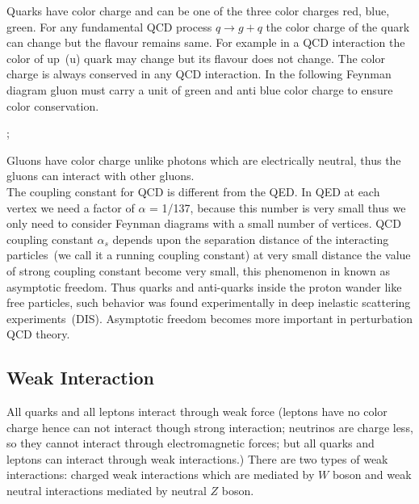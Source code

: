 Quarks have color charge and can be one of the three color charges red, blue, green. For any fundamental QCD process $q\rightarrow g+q$ the color charge of the quark can change but the flavour remains same. For example in a QCD interaction the color of up~(u) quark may change but its flavour does not change. The color charge is always conserved in any QCD interaction.
In the following Feynman diagram gluon must carry a unit of green and anti blue color charge to ensure color conservation.\\
\begin{center}
;
\end{center}
Gluons have color charge unlike photons which are electrically neutral, thus the gluons can interact with other gluons.\\
The coupling constant for QCD is different from the QED. In QED at each vertex we need a factor of $\alpha$ = 1/137, because this number is very small thus we only need to consider Feynman diagrams with a small number of vertices. QCD coupling constant $\alpha_{s}$ depends upon the separation distance of the interacting particles~(we call it a running coupling constant) at very small distance the value of strong coupling constant become very small, this phenomenon in known as asymptotic freedom. Thus quarks and anti-quarks inside the proton wander like free particles, such behavior was found experimentally in deep inelastic scattering experiments~(DIS). Asymptotic freedom becomes more important in perturbation QCD theory.
\subsection{Weak Interaction}
All quarks and all leptons interact through weak force (leptons have no color charge hence can not interact though strong interaction; neutrinos are charge less, so they cannot interact through electromagnetic forces; but all quarks and leptons can interact through weak interactions.) There are two types of weak interactions: charged weak interactions which are mediated by $W$ boson and weak neutral interactions mediated by neutral $Z$ boson.\\


